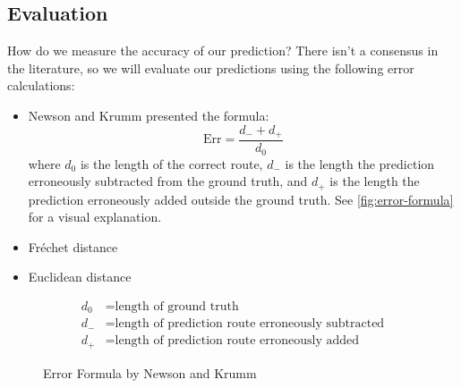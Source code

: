 \documentclass{article}
\numberwithin{equation}{section}
\theoremstyle{definition}
\begin{document}
\subsection{Evaluation} \label{Eval}
\label{sub:evaluation}

How do we measure the accuracy of our prediction? There isn't a consensus in the literature, so we will evaluate our predictions using the following error calculations:
\begin{itemize}
    \item Newson and Krumm presented the formula: $$\textrm{Err} = \frac{d_- + d_+}{d_0}$$ where $d_0$ is the length of the correct route, $d_-$ is the length the prediction erroneously subtracted from the ground truth, and $d_+$ is the length the prediction erroneously added outside the ground truth. See \autoref{fig:error-formula} \cite{newsonHiddenMarkovMap2009} for a visual explanation.
    \item Fréchet distance
    \item Euclidean distance
\end{itemize}

\begin{figure}[ht]
    \centering
    \def\svgwidth{\linewidth}
    
    \begin{align*}
	    d_0 &= \text{length of ground truth}\\
	    d_- &= \text{length of prediction route erroneously subtracted}\\
	    d_{+} &= \text{length of prediction route erroneously added}
    \end{align*}
    \caption{Error Formula by Newson and Krumm}
    \label{fig:error-formula}
\end{figure}


\end{document}
